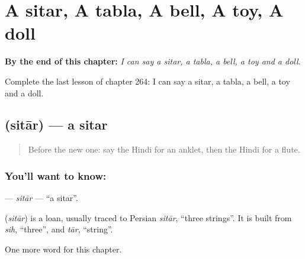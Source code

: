 
\chapter{A sitar, A tabla, A bell, A toy, A doll}
\label{ch:hi-a-sitar-a-tabla-a-bell-a-toy-a-doll}

\begin{chapteropening}
\textbf{By the end of this chapter:} \emph{I can say a sitar, a tabla, a bell, a toy and a doll.}

Complete the last lesson of chapter 264: I can say a sitar, a tabla, a bell, a toy and a doll.
\end{chapteropening}

\section[\texorpdfstring{\hi{सितार} (sitār)}{सितार (sitār)}]{ (sitār) — a sitar}

\label{lesson:HI-C264-sitar}



\begin{quote}
Before the new one: say the Hindi for an anklet, then the Hindi for a flute.
\end{quote}

\subsection*{You'll want to know: }
\textbf{} — \emph{sitār} — \textquotedblleft{}a sitar\textquotedblright{}.

\begin{cousinweb}
\textbf{} (\emph{sitār}) is a loan, usually traced to Persian \emph{sitār}, \textquotedblleft{}three strings\textquotedblright{}. It is built from \emph{sih}, \textquotedblleft{}three\textquotedblright{}, and \emph{tār}, \textquotedblleft{}string\textquotedblright{}.
\end{cousinweb}

\begin{grammarlens}[title={What you've built}]
One more word for this chapter.
\end{grammarlens}

